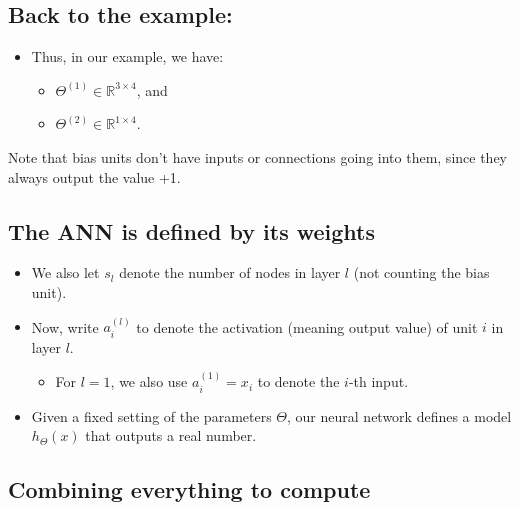 \documentclass[
  letterpaper,
  DIV=11,
  numbers=noendperiod]{scrartcl}
\providecommand{\tightlist}{%
  \setlength{\itemsep}{0pt}\setlength{\parskip}{0pt}}\usepackage{longtable,booktabs,array}
\begin{document}
\hypertarget{back-to-the-example}{%
\subsection{Back to the example:}\label{back-to-the-example}}

\begin{itemize}
\item
  Thus, in our example, we have:

  \begin{itemize}
  \tightlist
  \item
    \(\Theta^{(1)}\in\mathbb{R}^{3\times 4}\), and
  \item
    \(\Theta^{(2)}\in\mathbb{R}^{1\times 4}\).
  \end{itemize}
\end{itemize}

Note that bias units don't have inputs or connections going into them,
since they always output the value +1.

\hypertarget{the-ann-is-defined-by-its-weights}{%
\subsection{The ANN is defined by its
weights}\label{the-ann-is-defined-by-its-weights}}

\begin{itemize}
\item
  We also let \(s_l\) denote the number of nodes in layer \(l\) (not
  counting the bias unit).
\item
  Now, write \(a^{(l)}_i\) to denote the activation (meaning output
  value) of unit \(i\) in layer \(l\).

  \begin{itemize}
  \tightlist
  \item
    For \(l=1\), we also use \(a^{(1)}_i=x_i\) to denote the \(i\)-th
    input.
  \end{itemize}
\item
  Given a fixed setting of the parameters \(\Theta\), our neural network
  defines a model \(h_{\Theta}(x)\) that outputs a real number.
\end{itemize}

\hypertarget{combining-everything-to-compute}{%
\subsection{Combining everything to
compute}\label{combining-everything-to-compute}}
\end{document}
